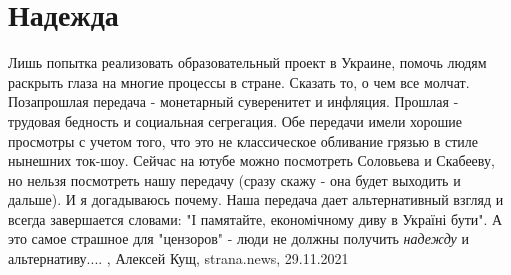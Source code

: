  
 
 
 
 
\chapter{Надежда}

Лишь попытка реализовать образовательный проект в Украине, помочь людям
раскрыть глаза на многие процессы в стране.  Сказать то, о чем все молчат.
Позапрошлая передача - монетарный суверенитет и инфляция.  Прошлая - трудовая
бедность и социальная сегрегация.  Обе передачи имели хорошие просмотры с
учетом того, что это не классическое обливание грязью в стиле нынешних ток-шоу.
Сейчас на ютубе можно посмотреть Соловьева и Скабееву, но нельзя посмотреть
нашу передачу (сразу скажу - она будет выходить и дальше).  И я догадываюсь
почему.  Наша передача дает альтернативный взгляд и всегда завершается словами:
"І памятайте, економічному диву в Україні бути".  А это самое страшное для
"цензоров" - люди не должны получить \emph{надежду} и альтернативу....
, 
Алексей Кущ, strana.news, 29.11.2021
